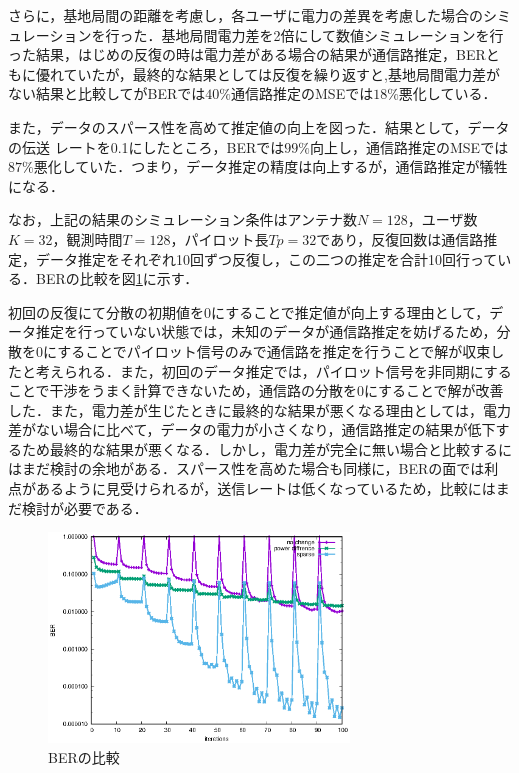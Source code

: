\documentclass{jarticle}
\begin{document}
さらに，基地局間の距離を考慮し，各ユーザに電力の差異を考慮した場合のシミュレーションを行った．基地局間電力差を2倍にして数値シミュレーションを行った結果，はじめの反復の時は電力差がある場合の結果が通信路推定，BERともに優れていたが，最終的な結果としては反復を繰り返すと,基地局間電力差がない結果と比較してがBERでは$40\%$通信路推定のMSEでは$18\%$悪化している．

また，データのスパース性を高めて推定値の向上を図った．結果として，データの伝送
レートを0.1にしたところ，BERでは$99\%$向上し，通信路推定のMSEでは$87\%$悪化していた．つまり，データ推定の精度は向上するが，通信路推定が犠牲になる．

なお，上記の結果のシミュレーション条件はアンテナ数$N=128$，ユーザ数$K=32$，観測時間$T=128$，パイロット長$Tp=32$であり，反復回数は通信路推定，データ推定をそれぞれ10回ずつ反復し，この二つの推定を合計10回行っている．BERの比較を図\ref{fig:result}に示す．

初回の反復にて分散の初期値を0にすることで推定値が向上する理由として，データ推定を行っていない状態では，未知のデータが通信路推定を妨げるため，分散を0にすることでパイロット信号のみで通信路を推定を行うことで解が収束したと考えられる．また，初回のデータ推定では，パイロット信号を非同期にすることで干渉をうまく計算できないため，通信路の分散を0にすることで解が改善した．また，電力差が生じたときに最終的な結果が悪くなる理由としては，電力差がない場合に比べて，データの電力が小さくなり，通信路推定の結果が低下するため最終的な結果が悪くなる．しかし，電力差が完全に無い場合と比較するにはまだ検討の余地がある．スパース性を高めた場合も同様に，BERの面では利点があるように見受けられるが，送信レートは低くなっているため，比較にはまだ検討が必要である．

\begin{figure}[htbp]
    \begin{center}
     \includegraphics[width=80mm]{./result.eps}
    \end{center}
    \caption{BERの比較}
    \label{fig:result}
\end{figure}


\end{document}
